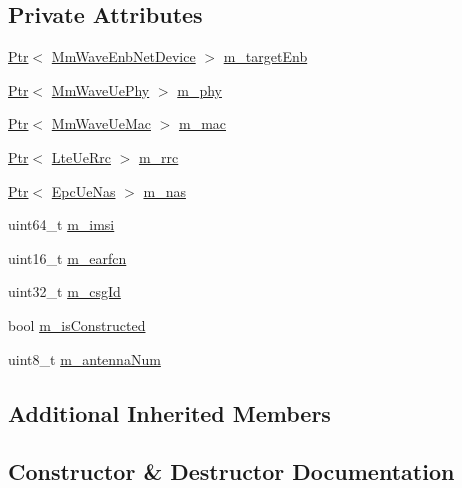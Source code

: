 \subsection*{Private Attributes}
\begin{DoxyCompactItemize}
\item 
\hyperlink{classns3_1_1Ptr}{Ptr}$<$ \hyperlink{classns3_1_1MmWaveEnbNetDevice}{Mm\+Wave\+Enb\+Net\+Device} $>$ \hyperlink{classns3_1_1MmWaveUeNetDevice_a2c801f63c2a5e84e8c81253d6453e5c8}{m\+\_\+target\+Enb}
\item 
\hyperlink{classns3_1_1Ptr}{Ptr}$<$ \hyperlink{classns3_1_1MmWaveUePhy}{Mm\+Wave\+Ue\+Phy} $>$ \hyperlink{classns3_1_1MmWaveUeNetDevice_ae85407943b5c4ae32f51969537b67157}{m\+\_\+phy}
\item 
\hyperlink{classns3_1_1Ptr}{Ptr}$<$ \hyperlink{classns3_1_1MmWaveUeMac}{Mm\+Wave\+Ue\+Mac} $>$ \hyperlink{classns3_1_1MmWaveUeNetDevice_afd2fdd52e80c28cb09e77487d885daac}{m\+\_\+mac}
\item 
\hyperlink{classns3_1_1Ptr}{Ptr}$<$ \hyperlink{classns3_1_1LteUeRrc}{Lte\+Ue\+Rrc} $>$ \hyperlink{classns3_1_1MmWaveUeNetDevice_aa4abc428c965374f4106eb1e3f385bef}{m\+\_\+rrc}
\item 
\hyperlink{classns3_1_1Ptr}{Ptr}$<$ \hyperlink{classns3_1_1EpcUeNas}{Epc\+Ue\+Nas} $>$ \hyperlink{classns3_1_1MmWaveUeNetDevice_a319384837270ac64549ce162cdc58c68}{m\+\_\+nas}
\item 
uint64\+\_\+t \hyperlink{classns3_1_1MmWaveUeNetDevice_accb498f57e59995ffc28d6c43972b704}{m\+\_\+imsi}
\item 
uint16\+\_\+t \hyperlink{classns3_1_1MmWaveUeNetDevice_abb52cd637f2c5286b7217ba052540da4}{m\+\_\+earfcn}
\item 
uint32\+\_\+t \hyperlink{classns3_1_1MmWaveUeNetDevice_a1d4f36f4bc6f877b8353af1ef8209be7}{m\+\_\+csg\+Id}
\item 
bool \hyperlink{classns3_1_1MmWaveUeNetDevice_a1f179adb1f72bfa7217facaff41070fe}{m\+\_\+is\+Constructed}
\item 
uint8\+\_\+t \hyperlink{classns3_1_1MmWaveUeNetDevice_afd15523e3af5d08f8cf91f816b35e248}{m\+\_\+antenna\+Num}
\end{DoxyCompactItemize}
\subsection*{Additional Inherited Members}


\subsection{Constructor \& Destructor Documentation}
